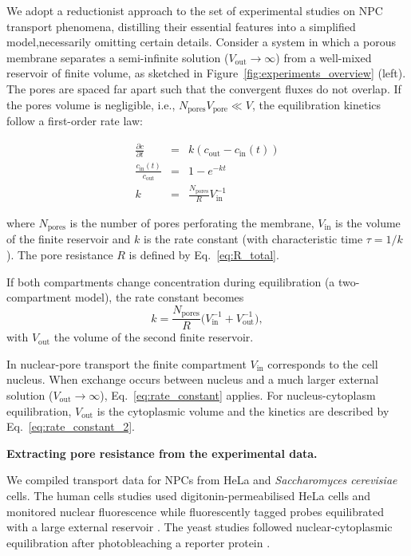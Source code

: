 \documentclass[10pt, a4paper]{article}
\begin{document}
\begin{multicols}{2}
We adopt a reductionist approach to the set of experimental studies on NPC transport phenomena, distilling their essential features into a simplified model,necessarily omitting certain details.
Consider a system in which a porous membrane separates a semi-infinite solution ($V_{\text{out}} \to \infty$) from a well-mixed reservoir of finite volume, as sketched in Figure~\ref{fig:experiments_overview} (left).
The pores are spaced far apart such that the convergent fluxes do not overlap.
If the pores volume is negligible, i.e., $N_{\text{pores}}V_{\text{pore}} \ll V$, the equilibration kinetics follow a first-order rate law:

\begin{eqnarray}
    \frac{\partial c}{\partial t} &=& k (c_{\text{out}} - c_{\text{in}}(t)) \\
    \frac{c_{\text{in}}(t)}{c_{\text{out}}} &=& 1 - e^{-kt} \label{eq:kinetics} \\
    k &=& \frac{N_{\text{pores}}}{R} V_{\text{in}}^{-1}
    \label{eq:rate_constant}
\end{eqnarray}

where $N_{\text{pores}}$ is the number of pores perforating the membrane,
$V_{\text{in}}$ is the volume of the finite reservoir and 
$k$ is the rate constant (with characteristic time $\tau = 1/k$).
The pore resistance $R$ is defined by Eq.~\ref{eq:R_total}.


If both compartments change concentration during equilibration
(a two-compartment model), the rate constant becomes
\begin{equation}
  k = \frac{N_{\text{pores}}}{R}
      \bigl(V_{\text{in}}^{-1}+V_{\text{out}}^{-1}\bigr),
  \label{eq:rate_constant_2}
\end{equation}
with $V_{\text{out}}$ the volume of the second finite reservoir.

In nuclear-pore transport the finite compartment $V_{\text{in}}$ corresponds to the cell nucleus.  
When exchange occurs between nucleus and a much larger external solution ($V_{\text{out}}\!\to\!\infty$), Eq.~\ref{eq:rate_constant} applies.
For nucleus-cytoplasm equilibration, $V_{\text{out}}$ is the cytoplasmic volume and the kinetics are described by Eq.~\ref{eq:rate_constant_2}.


\textbf{Extracting pore resistance from the experimental data.}
    
We compiled transport data for NPCs from HeLa and \textit{Saccharomyces cerevisiae} cells.  
The human cells studies used digitonin-permeabilised HeLa cells and monitored nuclear fluorescence while fluorescently tagged probes equilibrated with a large external reservoir 
\cite{Ribbeck2001,Mohr2009,Frey2018}.  
The yeast studies followed nuclear-cytoplasmic equilibration after
photobleaching a reporter protein \cite{Popken2015,Timney2016}.


\end{multicols}
\end{document}
